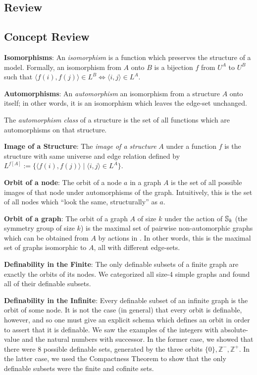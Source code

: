 \subsection{Review}
\begin{mdframed}[linewidth=1]
\section*{Concept Review}
\textbf{Isomorphisms}: An \emph{isomorphism} is a function which preserves the structure of a model. Formally, an isomorphism from $A$ onto $B$ is a bijection $f$ from $U^A$ to $U^B$ such that $\langle f(i), f(j) \rangle \in L^B \iff \langle i, j \rangle \in L^A$. 

\textbf{Automorphisms}: An \emph{automorphism} an isomorphism from a structure $A$ onto itself; in other words, it is an isomorphism which leaves the edge-set unchanged. 

The \emph{automorphism class} of a structure is the set of all functions which are automorphisms on that structure. 

\textbf{Image of a Structure}: The \emph{image of a structure} $A$ under a function $f$ is the structure with same universe and edge relation defined by $L^{f[A]} := \{\langle f(i), f(j) \rangle \mid \langle i, j \rangle \in L^A\}$. 

\textbf{Orbit of a node}: The orbit of a node $a$ in a graph $A$ is the set of all possible images of that node under automorphisms of the graph. Intuitively, this is the set of all nodes which ``look the same, structurally'' as $a$. 

\textbf{Orbit of a graph}: The orbit of a graph $A$ of size $k$ under the action of $\mbox{$\mathbb{S}_{k}$}$ (the symmetry group of size $k$) is the maximal set of pairwise non-automorphic graphs which can be obtained from $A$ by actions in . In other words, this is the maximal set of graphs isomorphic to $A$, all with different edge-sets. 

\textbf{Definability in the Finite}: The only definable subsets of a finite graph are exactly the orbits of its nodes. We categorized all size-4 simple graphs and found all of their definable subsets. 

\textbf{Definability in the Infinite}: Every definable subset of an infinite graph is the orbit of some node. It is not the case (in general) that every orbit is definable, however, and so one must give an explicit schema which defines an orbit in order to assert that it is definable. We saw the examples of the integers with absolute-value and the natural numbers with successor. In the former case, we showed that there were $8$ possible definable sets, generated by the three orbits $\{0\}, \mathbb{Z}^{-}, \mathbb{Z}^{+}$. In the latter case, we used the Compactness Theorem to show that the only definable subsets were the finite and cofinite sets. 


\end{mdframed}
